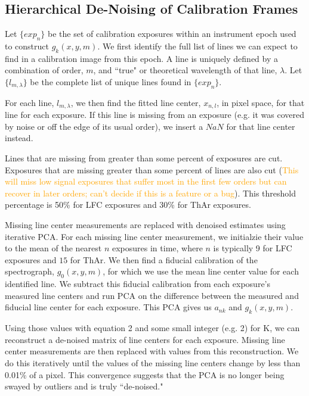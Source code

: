 \documentclass[12pt, letterpaper]{article}
\newcommand{\lz}[1]{\textcolor{orange}{#1}}
\begin{document}
\subsection{Hierarchical De-Noising of Calibration Frames} \label{sec:denoising}
Let $\{exp_n\}$ be the set of calibration exposures within an instrument epoch used to construct $g_k(x,y,m)$.  We first identify the full list of lines we can expect to find in a calibration image from this epoch.  A line is uniquely defined by a combination of order, $m$, and ``true" or theoretical wavelength of that line, $\lambda$.  Let $\{l_{m,\lambda}\}$ be the complete list of unique lines found in $\{exp_n\}$.

For each line, $l_{m,\lambda}$, we then find the fitted line center, $x_{n,l}$, in pixel space, for that line for each exposure.  If this line is missing from an exposure (e.g. it was covered by noise or off the edge of its usual order), we insert a $NaN$ for that line center instead.

Lines that are missing from greater than some percent of exposures are cut.  Exposures that are missing greater than some percent of lines are also cut (\lz{This will miss low signal exposures that suffer most in the first few orders but can recover in later orders; can't decide if this is a feature or a bug}).  This threshold percentage is 50\% for LFC exposures and 30\% for ThAr exposures.

Missing line center measurements are replaced with denoised estimates using iterative PCA.  For each missing line center measurement, we initialzie their value to the mean of the nearest $n$ exposures in time, where $n$ is typically 9 for LFC exposures and $15$ for ThAr.  We then find a fiducial calibration of the spectrograph,  $g_0(x,y,m)$, for which we use the mean line center value for each identified line.  We subtract this fiducial calibration from each exposure's measured line centers and run PCA on the difference between the measured and fiducial line center for each exposure.  This PCA gives us $a_{nk}$ and $g_k(x,y,m)$.

Using those values with equation 2 and some small integer (e.g. 2) for K, we can reconstruct a de-noised matrix of line centers for each exposure.  Missing line center measurements are then replaced with values from this reconstruction.  We do this iteratively until the values of the missing line centers change by less than 0.01\% of a pixel.  This convergence suggests that the PCA is no longer being swayed by outliers and is truly ``de-noised."
\end{document}
